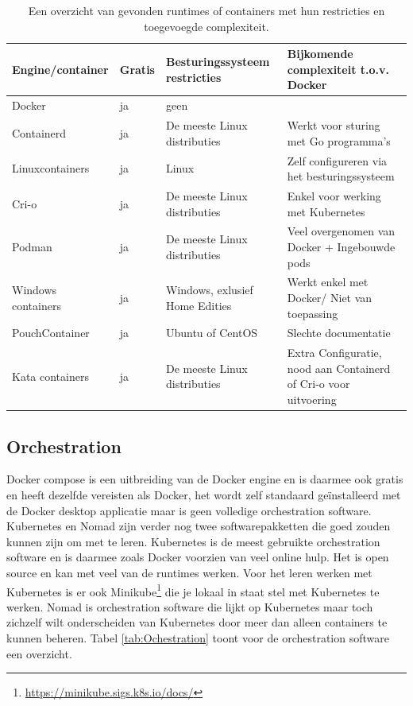 \begin{center}
    \begin{table}
    \begin{tabular}{ m{3.5cm} || m{1cm} | m{3.3cm} | m{4.5cm} }
        Engine/container & Gratis & Besturingssysteem restricties & Bijkomende complexiteit t.o.v. Docker \\ 
        \hline
        Docker & ja & geen &  \\  
        \hline
        Containerd & ja & De meeste Linux distributies & Werkt voor sturing met Go programma’s \\
        \hline 
        Linuxcontainers & ja & Linux & Zelf configureren via het besturingssysteem \\
        \hline
        Cri-o & ja & De meeste Linux distributies & Enkel voor werking met Kubernetes \\
        \hline
        Podman & ja & De meeste Linux distributies & Veel overgenomen van Docker + Ingebouwde pods \\
        \hline
        Windows containers & ja & Windows, exlusief Home Edities & Werkt enkel met Docker/ Niet van toepassing \\
        \hline
        PouchContainer & ja & Ubuntu of CentOS & Slechte documentatie \\
        \hline
        Kata containers & ja & De meeste Linux distributies & Extra Configuratie, nood aan Containerd of Cri-o voor uitvoering \\
    \end{tabular}
    \caption[Overzicht Runtimes en containers]{Een overzicht van gevonden runtimes of containers met hun restricties en toegevoegde complexiteit.}
    \label{tab:Engines}
    \end{table}
\end{center}

\subsection{Orchestration}
Docker compose is een uitbreiding van de Docker engine en is daarmee ook gratis en heeft dezelfde vereisten als Docker, het wordt zelf standaard geïnstalleerd met de Docker desktop applicatie maar is geen volledige orchestration software. Kubernetes en Nomad zijn verder nog twee softwarepakketten die goed zouden kunnen zijn om met te leren. Kubernetes is de meest gebruikte orchestration software en is daarmee zoals Docker voorzien van veel online hulp. Het is open source en kan met veel van de runtimes werken. Voor het leren werken met Kubernetes is er ook Minikube\footnote{\url{https://minikube.sigs.k8s.io/docs/}} die je lokaal in staat stel met Kubernetes te werken. Nomad is orchestration software die lijkt op Kubernetes maar toch zichzelf wilt onderscheiden van Kubernetes door meer dan alleen containers te kunnen beheren. Tabel \ref{tab:Ochestration} toont voor de orchestration software een overzicht.

